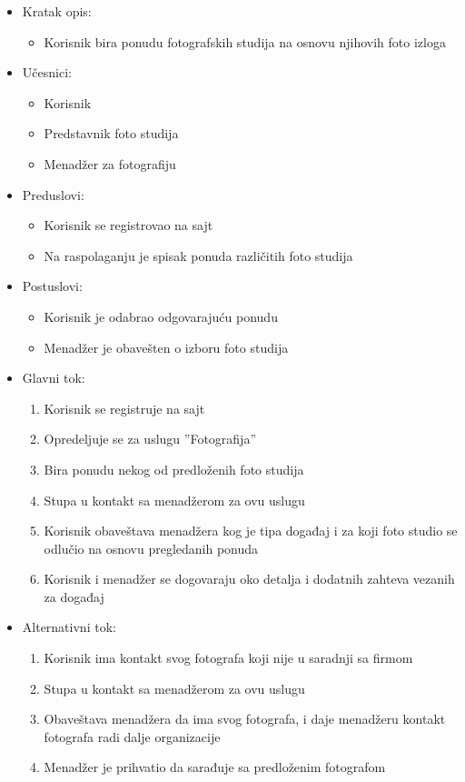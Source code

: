 \documentclass[a4paper]{article}
\begin{document}
\begin{itemize}
    \item Kratak opis: 
    \begin{itemize}
        \item Korisnik bira ponudu fotografskih studija na osnovu njihovih foto izloga
    \end{itemize}
    \item Učesnici:
        \begin{itemize}
        \item Korisnik
        \item Predstavnik foto studija
        \item Menadžer za fotografiju
    \end{itemize}
    \item Preduslovi:
        \begin{itemize}
            \item Korisnik se registrovao na sajt
            \item Na raspolaganju je spisak ponuda različitih foto studija
        \end{itemize}
    \item Postuslovi:
        \begin{itemize}
            \item Korisnik je odabrao odgovarajuću ponudu
            \item Menadžer je obavešten o izboru foto studija
        \end{itemize}
    \item Glavni tok:
        \begin{enumerate}
            \item Korisnik se registruje na sajt
            \item Opredeljuje se za uslugu ''Fotografija''
            \item Bira ponudu nekog od predloženih foto studija
            \item Stupa u kontakt sa menadžerom za ovu uslugu
            \item Korisnik obaveštava menadžera kog je tipa događaj i za koji foto studio se odlučio na osnovu pregledanih ponuda 
            \item Korisnik i menadžer se dogovaraju oko detalja i dodatnih zahteva vezanih za događaj
        \end{enumerate}
    \item Alternativni tok:
        \begin{enumerate}
            \item Korisnik ima kontakt svog fotografa koji nije u saradnji sa firmom
            \item Stupa u kontakt sa menadžerom za ovu uslugu
            \item Obaveštava menadžera da ima svog fotografa, i daje menadžeru kontakt fotografa radi dalje organizacije
            \item Menadžer je prihvatio da sarađuje sa predloženim fotografom
        \end{enumerate}
\end{itemize}
\end{document}
